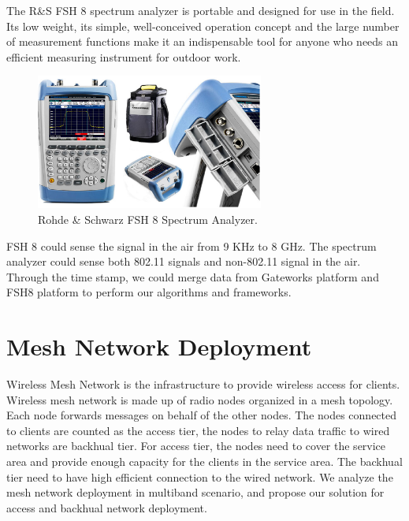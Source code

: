 The R\&S FSH 8 spectrum analyzer is portable and designed for use in the field. 
Its low weight, its simple, well-conceived operation concept and the large number 
of measurement functions make it an indispensable tool for anyone who needs an 
efficient measuring instrument for outdoor work.


\begin{figure} 
\centering
\includegraphics[width=75mm]{figures/fsh8}
\vspace{-0.1in}
\caption{Rohde \& Schwarz FSH 8 Spectrum Analyzer.}
\label{fig:fsh8}
\vspace{0.1in}
\end{figure}

FSH 8 could sense the signal in the air from 9 KHz to 8 GHz. 
The spectrum analyzer could sense both 802.11 signals and
non-802.11 signal in the air. Through the time stamp, we could 
merge data from Gateworks platform and FSH8 platform to perform
our algorithms and frameworks.

\section{Mesh Network Deployment}

Wireless Mesh Network is the infrastructure to provide wireless access for 
clients. Wireless mesh network is made up of radio 
nodes organized in a mesh topology. Each node forwards messages on behalf 
of the other nodes. The nodes connected to clients are counted as the access
tier, the nodes to relay data traffic to wired networks are backhual tier.
For access tier, the nodes need to cover the service area and provide
enough capacity for the clients in the service area.
The backhual tier need to have high efficient connection to
the wired network. 
We analyze the mesh network deployment in multiband scenario, and propose
our solution for access and backhual network deployment.



